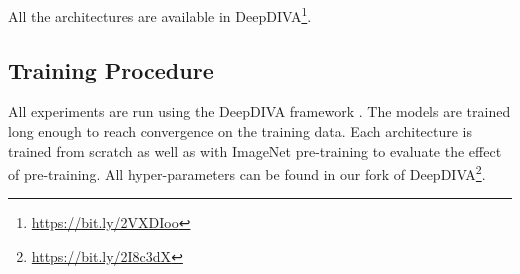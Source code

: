 \documentclass[journal]{IEEEtran}
\newcommand{\ls}[1]{{\color{black}#1}}
\begin{document}
All the architectures are available in DeepDIVA\footnote{\url{https://bit.ly/2VXDIoo}}.

\begin{comment}
\begin{table}[t!]
    \caption{Overview of all the architectures used in this paper. VGG19, Inception V3, ResNet152 and DenseNet121 have been used for the classification and image-based content retrieval task. These networks expect a certain input size. FC-Densent57 (Tiramisu), SegNet and DeepLabV3 are architectures used for segmentation. These architectures can take various input sizes, we sampled random crops of size 256 from the input images.}
    \label{tab:architectures_overview}
    \vskip 0.15in
    \begin{center}
    \begin{small}
    \begin{sc}
    \begin{tabular}{l rc c }
    \toprule
        & \# parameters && input size \\
        \cmidrule{2-2} \cmidrule{4-4}
        VGG19 BN \cite{simonyan2014very} & $140'105'664$ && $224\times224$ \\
        Inception V3 \cite{Szegedy_2015_CVPR} & $24'703'968$ && $299\times299$ \\
        ResNet152 \cite{DBLP:journals/corr/HeZRS15} & $58'406'080$ && $224\times224$ \\
        DenseNet121 \cite{DBLP:journals/corr/HuangLW16a} & $7'085'056$ && $224\times224$ \\
        FC-Densenet57 \cite{jegou2017one} & $1'376'216$ && $256\times256$ \\
        UNet \cite{ronneberger2015u} & $34'573'713$ && $256\times256$ \\
    \bottomrule
    \end{tabular}
    \end{sc}
    \end{small}
    \end{center}
    \vskip -0.1in
\end{table}
\end{comment}

\subsection{Training Procedure}
\label{exp:training}


All experiments are run using the DeepDIVA framework \cite{alberti2018deepdiva}. \ls{The models are trained long enough to reach convergence on the training data.}
Each architecture is trained from scratch as well as with ImageNet \cite{imagenet_cvpr09} pre-training to evaluate the effect of pre-training.
All hyper-parameters can be found in our fork of DeepDIVA\footnote{\url{https://bit.ly/2I8c3dX}}.
\end{document}
